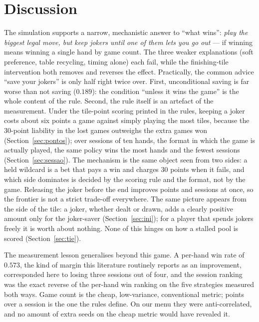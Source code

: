 \documentclass[11pt]{article}
\begin{document}
\section{Discussion}\label{sec:disc}
The simulation supports a narrow, mechanistic answer to ``what wins'': \emph{play the biggest legal move, but keep jokers until one of them lets you go out} --- if winning means winning a single hand by game count. The three weaker explanations (soft preference, table recycling, timing alone) each fail, while the finishing-tile intervention both removes and reverses the effect. Practically, the common advice ``save your jokers'' is only half right twice over. First, unconditional saving is far worse than not saving ($0.189$): the condition ``unless it wins the game'' is the whole content of the rule. Second, the rule itself is an artefact of the measurement. Under the tile-point scoring printed in the rules, keeping a joker costs about six points a game against simply playing the most tiles, because the $30$-point liability in the lost games outweighs the extra games won (Section~\ref{sec:pontos}); over sessions of ten hands, the format in which the game is actually played, the same policy wins the most hands and the fewest sessions (Section~\ref{sec:sessao}). The mechanism is the same object seen from two sides: a held wildcard is a bet that pays a win and charges $30$ points when it fails, and which side dominates is decided by the scoring rule and the format, not by the game. Releasing the joker before the end improves points and sessions at once, so the frontier is not a strict trade-off everywhere. The same picture appears from the side of the tile: a joker, whether dealt or drawn, adds a clearly positive amount only for the joker-saver (Section~\ref{sec:ini}); for a player that spends jokers freely it is worth about nothing. None of this hinges on how a stalled pool is scored (Section~\ref{sec:tie}).

The measurement lesson generalises beyond this game. A per-hand win rate of $0.573$, the kind of margin this literature routinely reports as an improvement, corresponded here to losing three sessions out of four, and the session ranking was the exact reverse of the per-hand win ranking on the five strategies measured both ways. Game count is the cheap, low-variance, conventional metric; points over a session is the one the rules define. On our menu they were anti-correlated, and no amount of extra seeds on the cheap metric would have revealed it.
\end{document}
